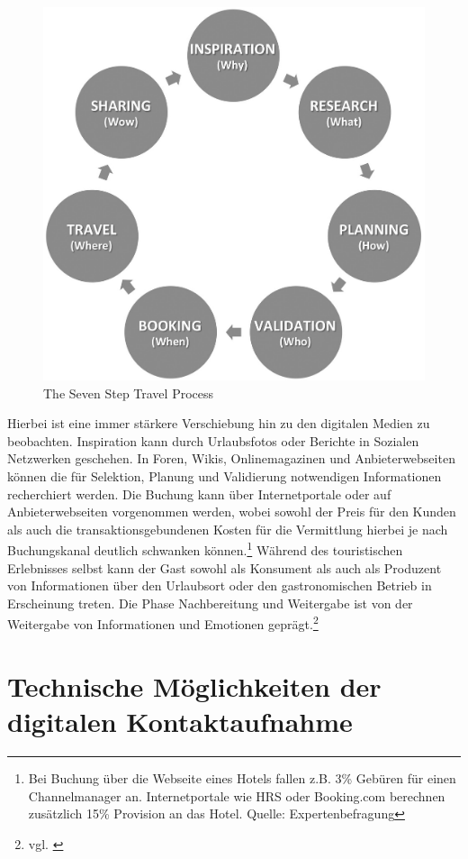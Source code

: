 \begin{figure}[H]
\begin{center}
\includegraphics[width=.5\textwidth]{7stages.jpg}
\caption[The Seven Step Travel Process]{The Seven Step Travel Process\protect\footnotemark}
\label{pic:sevenstages}
\end{center}
\end{figure}

Hierbei ist eine immer stärkere Verschiebung hin zu den digitalen Medien zu beobachten. Inspiration kann durch Urlaubsfotos oder Berichte in Sozialen Netzwerken geschehen. In Foren, Wikis, Onlinemagazinen und Anbieterwebseiten können die für Selektion, Planung und Validierung notwendigen Informationen recherchiert werden. Die Buchung kann über Internetportale oder auf Anbieterwebseiten vorgenommen werden, wobei sowohl der Preis für den Kunden als auch die transaktionsgebundenen Kosten für die Vermittlung hierbei je nach Buchungskanal deutlich schwanken können.\footnote{Bei Buchung über die Webseite eines Hotels fallen z.B. 3\% Gebüren für einen Channelmanager an. Internetportale wie HRS oder Booking.com berechnen zusätzlich 15\% Provision an das Hotel. Quelle: Expertenbefragung} Während des touristischen Erlebnisses selbst kann der Gast sowohl als Konsument als auch als Produzent von Informationen über den Urlaubsort oder den gastronomischen Betrieb in Erscheinung treten. Die Phase Nachbereitung und Weitergabe ist von der Weitergabe von Informationen und Emotionen geprägt.\footnote{vgl. \cite{buhl}}






\newpage
\section{Technische Möglichkeiten der digitalen Kontaktaufnahme} %
\label{sec:technologien}


